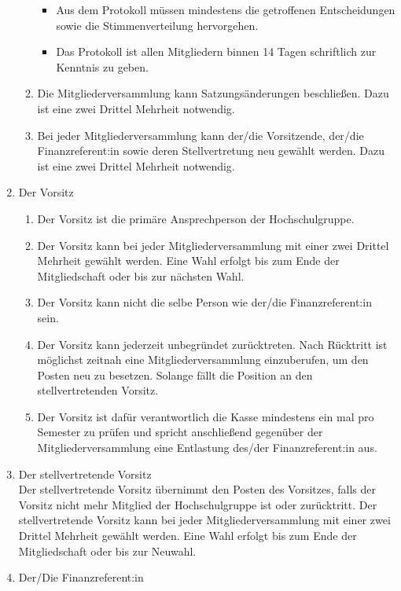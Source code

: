 \documentclass[11pt]{article}
\begin{document}
\begin{enumerate}
\begin{enumerate}
\begin{itemize}
			            \item Aus dem Protokoll müssen mindestens die getroffenen Entscheidungen sowie die Stimmenverteilung hervorgehen.
			            \item Das Protokoll ist allen Mitgliedern binnen 14 Tagen schriftlich zur Kenntnis zu geben.
		            \end{itemize}
		      \item Die Mitgliederversammlung kann Satzungsänderungen beschließen. Dazu ist eine zwei Drittel Mehrheit notwendig.
		      \item Bei jeder Mitgliederversammlung kann der/die Vorsitzende, der/die Finanzreferent:in sowie deren Stellvertretung neu gewählt werden. Dazu ist eine zwei Drittel Mehrheit notwendig.
	      \end{enumerate}
	\item Der Vorsitz
	      \begin{enumerate}
		      \item Der Vorsitz ist die primäre Ansprechperson der Hochschulgruppe.
		      \item Der Vorsitz kann bei jeder Mitgliederversammlung mit einer zwei Drittel Mehrheit gewählt werden. Eine Wahl erfolgt bis zum Ende der Mitgliedschaft oder bis zur nächsten Wahl.
		      \item Der Vorsitz kann nicht die selbe Person wie der/die Finanzreferent:in sein.
		      \item Der Vorsitz kann jederzeit unbegründet zurücktreten. Nach Rücktritt ist möglichst zeitnah eine Mitgliederversammlung einzuberufen, um den Posten neu zu besetzen. Solange fällt die Position an den stellvertretenden Vorsitz.
		      \item Der Vorsitz ist dafür verantwortlich die Kasse mindestens ein mal pro Semester zu prüfen und spricht anschließend gegenüber der Mitgliederversammlung eine Entlastung des/der Finanzreferent:in aus.
	      \end{enumerate}
	\item Der stellvertretende Vorsitz\\
	      Der stellvertretende Vorsitz übernimmt den Posten des Vorsitzes, falls der Vorsitz nicht mehr Mitglied der Hochschulgruppe ist oder zurücktritt. Der stellvertretende Vorsitz kann bei jeder Mitgliederversammlung mit einer zwei Drittel Mehrheit gewählt werden. Eine Wahl erfolgt bis zum Ende der Mitgliedschaft oder bis zur Neuwahl.
	\item Der/Die Finanzreferent:in
	      \begin{enumerate}

\end{enumerate}
\end{enumerate}
\end{document}
